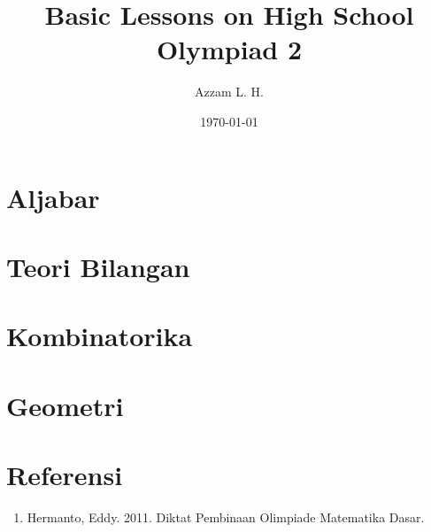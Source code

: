\title{Basic Lessons on High School Olympiad 2}
\date{\today}
\author{Azzam L. H.}
\maketitle
\renewcommand*\contentsname{Daftar Isi}
\tableofcontents

\newpage
\section{Aljabar}






\section{Teori Bilangan}








\section{Kombinatorika}




\section{Geometri}





\section{Referensi}
\begin{enumerate}
\item Hermanto, Eddy. 2011. Diktat Pembinaan Olimpiade Matematika Dasar.
\end{enumerate}


